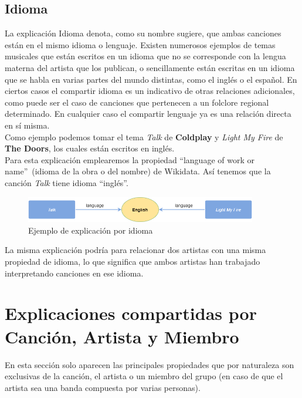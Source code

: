\subsection*{Idioma}

La explicación Idioma denota, como su nombre sugiere, que ambas canciones están en el mismo idioma o lenguaje. Existen numerosos ejemplos de temas musicales que están escritos en un idioma que no se corresponde con la lengua materna del artista que los publican, o sencillamente están escritas en un idioma que se habla en varias partes del mundo distintas, como el inglés o el español. En ciertos casos el compartir idioma es un indicativo de otras relaciones adicionales, como puede ser el caso de canciones que pertenecen a un folclore regional determinado. En cualquier caso el compartir lenguaje ya es una relación directa en sí misma.\\

Como ejemplo podemos tomar el tema \textit{Talk} de \textbf{Coldplay} y \textit{Light My Fire} de \textbf{The Doors}, los cuales están escritos en inglés.\\

Para esta explicación emplearemos la propiedad ``language of work or name''~(idioma de la obra o del nombre) de Wikidata. Así tenemos que la canción \textit{Talk} tiene idioma ``inglés''.\\

\begin{figure}[h!]
	\centering
	\includegraphics[width = 0.9\textwidth]{Imagenes/Bitmap/Idioma ejemplo.png}
	\caption{Ejemplo de explicación por idioma}
	\label{fig:sampleImage}
\end{figure}

La misma explicación podría para relacionar dos artistas con una misma propiedad de idioma, lo que significa que ambos artistas han trabajado interpretando canciones en ese idioma.\\

\section{Explicaciones compartidas por Canción, Artista y Miembro}

En esta sección solo aparecen las principales propiedades que por naturaleza son exclusivas de la canción, el artista o un miembro del grupo (en caso de que el artista sea una banda compuesta por varias personas).\\


